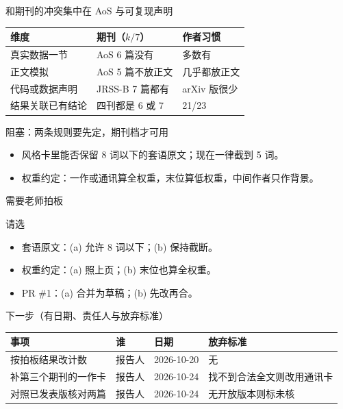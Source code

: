 \documentclass[aspectratio=169,10pt]{beamer}
\begin{document}
\begin{frame}{和期刊的冲突集中在 AoS 与可复现声明}
  \begin{tabular}{lll}
    \toprule
    维度 & 期刊（\(k/7\)） & 作者习惯 \\
    \midrule
    真实数据一节 & AoS 6 篇没有 & 多数有 \\
    正文模拟 & AoS 5 篇不放正文 & 几乎都放正文 \\
    代码或数据声明 & JRSS-B 7 篇都有 & arXiv 版很少 \\
    结果关联已有结论 & 四刊都是 6 或 7 & 21/23 \\
    \bottomrule
  \end{tabular}
\end{frame}

\begin{frame}{阻塞：两条规则要先定，期刊档才可用}
  \begin{itemize}
    \item 风格卡里能否保留 8 词以下的套语原文；现在一律截到 5 词。
    \item 权重约定：一作或通讯算全权重，末位算低权重，中间作者只作背景。
  \end{itemize}
\end{frame}

\begin{frame}{需要老师拍板}
  \begin{alertblock}{请选}
    \begin{itemize}
      \item 套语原文：(a) 允许 8 词以下；(b) 保持截断。
      \item 权重约定：(a) 照上页；(b) 末位也算全权重。
      \item PR \#1：(a) 合并为草稿；(b) 先改再合。
    \end{itemize}
  \end{alertblock}
\end{frame}

\begin{frame}{下一步（有日期、责任人与放弃标准）}
  \begin{tabular}{llll}
    \toprule
    事项 & 谁 & 日期 & 放弃标准 \\
    \midrule
    按拍板结果改计数 & 报告人 & 2026-10-20 & 无 \\
    补第三个期刊的一作卡 & 报告人 & 2026-10-24 & 找不到合法全文则改用通讯卡 \\
    对照已发表版核对两篇 & 报告人 & 2026-10-24 & 无开放版本则标未核 \\
    \bottomrule
  \end{tabular}
\end{frame}
\end{document}
